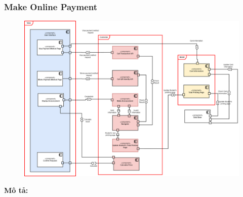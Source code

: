         \subsubsection{Make Online Payment}
        \begin{center}
        \begin{figure}[!htp]
        \begin{center}
         \includegraphics[scale=0.32]{images/Task3/Component Diagrams/paymentComponentDiagram.drawio.png}
        \end{center}
        \end{figure}
        \end{center}
        \newpage
        \textbf{Mô tả:}
